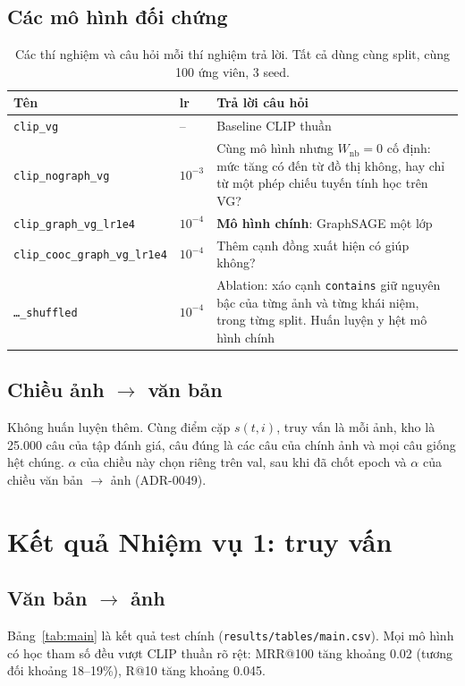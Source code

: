 \documentclass[12pt, a4paper]{article}
\makeatletter
\newcommand{\code}[1]{\texttt{#1}}
\newcommand{\mrr}{MRR@100}
\makeatother
\begin{document}
\subsection{Các mô hình đối chứng}
\begin{table}[H]
\centering\small
\caption{Các thí nghiệm và câu hỏi mỗi thí nghiệm trả lời. Tất cả dùng cùng split, cùng 100 ứng viên, 3 seed.}
\label{tab:exps}
\begin{tabularx}{\linewidth}{l l X}
\toprule
\textbf{Tên} & \textbf{lr} & \textbf{Trả lời câu hỏi} \\
\midrule
\code{clip\_vg} & -- & Baseline CLIP thuần \\
\code{clip\_nograph\_vg} & $10^{-3}$ & Cùng mô hình nhưng $W_{\text{nb}}=0$ cố định: mức tăng có đến từ đồ thị không, hay chỉ từ một phép chiếu tuyến tính học trên VG? \\
\code{clip\_graph\_vg\_lr1e4} & $10^{-4}$ & \textbf{Mô hình chính}: GraphSAGE một lớp \\
\code{clip\_cooc\_graph\_vg\_lr1e4} & $10^{-4}$ & Thêm cạnh đồng xuất hiện có giúp không? \\
\code{\dots\_shuffled} & $10^{-4}$ & Ablation: xáo cạnh \code{contains} giữ nguyên bậc của từng ảnh và từng khái niệm, trong từng split. Huấn luyện y hệt mô hình chính \\
\bottomrule
\end{tabularx}
\end{table}

\subsection{Chiều ảnh $\to$ văn bản}
Không huấn luyện thêm. Cùng điểm cặp $s(t,i)$, truy vấn là mỗi ảnh, kho là 25.000 câu của tập đánh giá, câu đúng là các câu của chính ảnh và mọi câu giống hệt chúng. $\alpha$ của chiều này chọn riêng trên val, sau khi đã chốt epoch và $\alpha$ của chiều văn bản $\to$ ảnh (ADR-0049).

\section{Kết quả Nhiệm vụ 1: truy vấn}
\label{sec:res1}

\subsection{Văn bản $\to$ ảnh}
Bảng~\ref{tab:main} là kết quả test chính (\code{results/tables/main.csv}). Mọi mô hình có học tham số đều vượt CLIP thuần rõ rệt: \mrr{} tăng khoảng 0.02 (tương đối khoảng 18--19\%), R@10 tăng khoảng 0.045.
\end{document}
